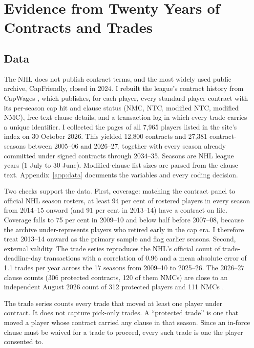 \section{Evidence from Twenty Years of Contracts and Trades}\label{sec:empirics}

\subsection{Data}

The NHL does not publish contract terms, and the most widely used public archive, CapFriendly, closed in 2024. I rebuilt the league's contract history from CapWages \citep{capwages}, which publishes, for each player, every standard player contract with its per-season cap hit and clause status (NMC, NTC, modified NTC, modified NMC), free-text clause details, and a transaction log in which every trade carries a unique identifier. I collected the pages of all 7,965 players listed in the site's index on 30 October 2026. This yielded 12,800 contracts and 27,381 contract-seasons between 2005--06 and 2026--27, together with every season already committed under signed contracts through 2034--35. Seasons are NHL league years (1 July to 30 June). Modified-clause list sizes are parsed from the clause text. Appendix~\ref{app:data} documents the variables and every coding decision.

Two checks support the data. First, coverage: matching the contract panel to official NHL season rosters, at least 94 per cent of rostered players in every season from 2014--15 onward (and 91 per cent in 2013--14) have a contract on file. Coverage falls to 75 per cent in 2009--10 and below half before 2007--08, because the archive under-represents players who retired early in the cap era. I therefore treat 2013--14 onward as the primary sample and flag earlier seasons. Second, external validity. The trade series reproduces the NHL's official count of trade-deadline-day transactions \citep{nhl_statspack} with a correlation of 0.96 and a mean absolute error of 1.1 trades per year across the 17 seasons from 2009--10 to 2025--26. The 2026--27 clause counts (306 protected contracts, 120 of them NMCs) are close to an independent August 2026 count of 312 protected players and 111 NMCs \citep{deseret_ntc}.

The trade series counts every trade that moved at least one player under contract. It does not capture pick-only trades. A ``protected trade'' is one that moved a player whose contract carried any clause in that season. Since an in-force clause must be waived for a trade to proceed, every such trade is one the player consented to.

